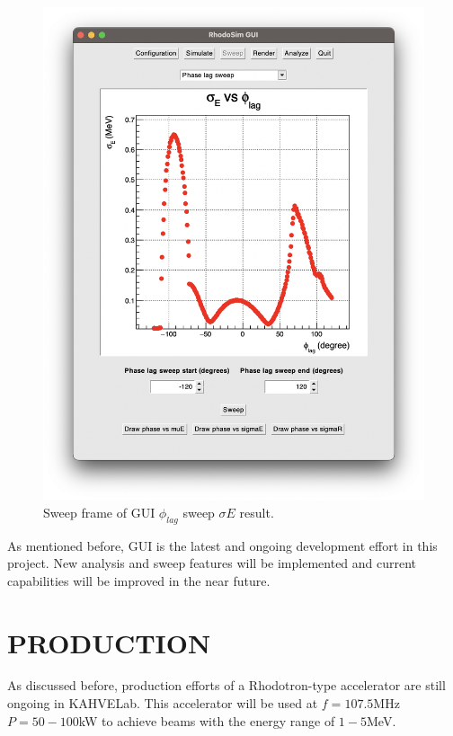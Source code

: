 \documentclass[a4paper,oneside,12pt]{report}
\numberwithin{equation}{chapter}
\begin{document}
{\begin{figure}[h]
    \includegraphics[width=0.85\linewidth]{./figures/rhodoSim/GUI_sweep_sE_3.png}
    \caption{Sweep frame of GUI $\phi_{lag}$ sweep $\sigma E$ result.}
    \label{fig:gui_sweep_sE}
    \vspace{10pt}
\end{figure}

As mentioned before, GUI is the latest and ongoing development effort in this project.
New analysis and sweep features will be implemented and current capabilities will be improved in the near future.



\newpage


\chapter{PRODUCTION}

As discussed before, production efforts of a Rhodotron-type accelerator are still ongoing in KAHVELab.
This accelerator will be used at $f=107.5$MHz $P=50-100$kW to achieve beams with the energy range of $1-5$MeV.
}
\end{document}
